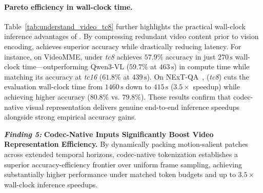 \paragraph{Pareto efficiency in wall-clock time.}
Table~\ref{tab:understand_video_tc8} further highlights the practical wall-clock inference advantages of \magevl. 
By compressing redundant video content prior to vision encoding, \magevl achieves superior accuracy while drastically reducing latency. For instance, on VideoMME, \magevl under \emph{tc8} achieves $57.9\%$ accuracy in just $270\,\mathrm{s}$ wall-clock time—outperforming Qwen3-VL ($59.7\%$ at $463\,\mathrm{s}$) in compute time while matching its accuracy at \emph{tc16} ($61.8\%$ at $439\,\mathrm{s}$). On NExT-QA~\cite{xiao2021next}, \magevl (\emph{tc8}) cuts the evaluation wall-clock time from $1460\,\mathrm{s}$ down to $415\,\mathrm{s}$ ($3.5\times$ speedup) while achieving higher accuracy ($80.8\%$ vs. $79.8\%$). These results confirm that codec-native visual representation delivers genuine end-to-end inference speedups alongside strong empirical accuracy gains.

\begin{promptbox}
\large
\textbf{\textit{Finding 5:}}
\textbf{Codec-Native Inputs Significantly Boost Video Representation Efficiency.}
By dynamically packing motion-salient patches across extended temporal horizons, codec-native tokenization establishes a superior accuracy-efficiency frontier over uniform frame sampling, achieving substantially higher performance under matched token budgets and up to $3.5\times$ wall-clock inference speedups.
\end{promptbox}






